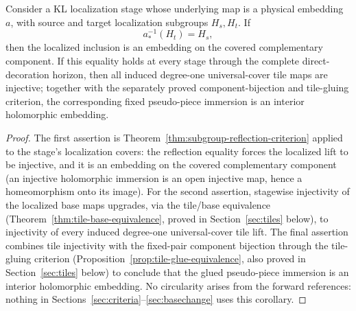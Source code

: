 \begin{corollary}
\label{cor:conditional-embedding-route}
Consider a KL localization stage whose underlying map is a physical
embedding \(a\), with source and target localization subgroups
\(H_s,H_t\).  If
\[
 a_*^{-1}(H_t)=H_s,
\]
then the localized inclusion is an embedding on the covered
complementary component.  If this equality holds at every stage through
the complete direct-decoration horizon, then all induced degree-one
universal-cover tile maps are injective; together with the separately
proved component-bijection and tile-gluing criterion, the corresponding
fixed pseudo-piece immersion is an interior holomorphic embedding.
\end{corollary}

\begin{proof}
The first assertion is Theorem~\ref{thm:subgroup-reflection-criterion}
applied to the stage's localization covers: the reflection equality
forces the localized lift to be injective, and it is an embedding on
the covered complementary component (an injective holomorphic
immersion is an open injective map, hence a homeomorphism onto its
image).  For the second assertion, stagewise injectivity of the
localized base maps upgrades, via the tile/base equivalence
(Theorem~\ref{thm:tile-base-equivalence}, proved in
Section~\ref{sec:tiles} below), to injectivity of every
induced degree-one universal-cover tile lift.  The final assertion
combines tile injectivity with the fixed-pair component bijection
through the tile-gluing criterion
(Proposition~\ref{prop:tile-glue-equivalence}, also proved in
Section~\ref{sec:tiles} below) to conclude that the
glued pseudo-piece immersion is an interior holomorphic embedding.
No circularity arises from the forward references: nothing in
Sections~\ref{sec:criteria}--\ref{sec:basechange} uses this corollary.
\end{proof}